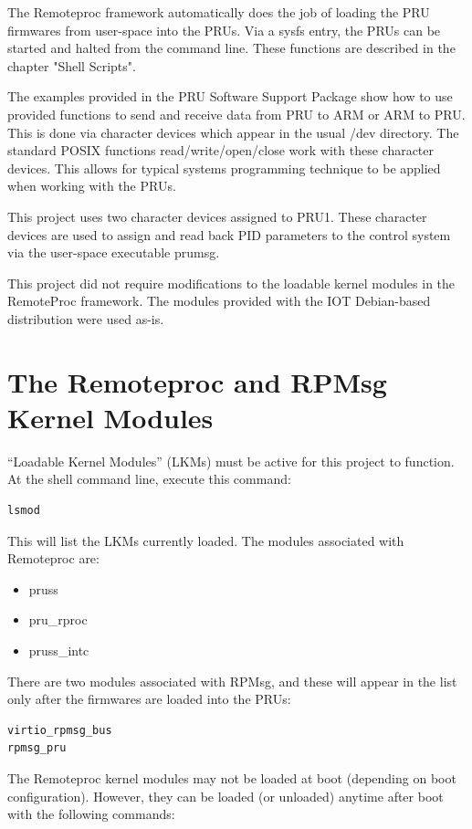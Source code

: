 The Remoteproc framework automatically does the job of loading the PRU firmwares from user-space into the PRUs.  Via a sysfs entry, the PRUs can be started and halted from the command line.  These functions are described in the chapter "Shell Scripts".

The examples provided in the PRU Software Support Package show how to use provided functions to send and receive data from PRU to ARM or ARM to PRU.  This is done via character devices which appear in the usual /dev directory.  The standard POSIX functions read/write/open/close work with these character devices.  This allows for typical systems programming technique to be applied when working with the PRUs.

This project uses two character devices assigned to PRU1.  These character devices are used to assign and read back PID parameters to the control system via the user-space executable prumsg.

This project did not require modifications to the loadable kernel modules in the RemoteProc framework.  The modules provided with the IOT Debian-based distribution were used as-is.

\section{The Remoteproc and RPMsg Kernel Modules}

``Loadable Kernel Modules'' (LKMs) must be active for this project to function.
At the shell command line, execute this command:

\begin{verbatim}
lsmod
\end{verbatim}

This will list the LKMs currently loaded.  The modules associated with Remoteproc are:

\begin{itemize}
\item pruss
\item pru\_rproc
\item pruss\_intc
\end{itemize}

There are two modules associated with RPMsg, and these will appear in the list only after the firmwares are loaded into the PRUs:

\begin{verbatim}
virtio_rpmsg_bus
rpmsg_pru
\end{verbatim}

The Remoteproc kernel modules may not be loaded at boot (depending on boot configuration).  However, they can be loaded (or unloaded) anytime after boot with the following commands:

